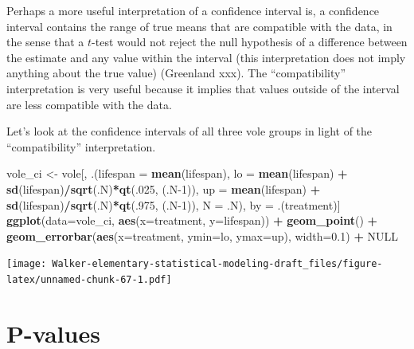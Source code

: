 \documentclass[]{book}
\newenvironment{Shaded}{\begin{snugshade}}{\end{snugshade}}
\newcommand{\DataTypeTok}[1]{\textcolor[rgb]{0.13,0.29,0.53}{#1}}
\newcommand{\DecValTok}[1]{\textcolor[rgb]{0.00,0.00,0.81}{#1}}
\newcommand{\FloatTok}[1]{\textcolor[rgb]{0.00,0.00,0.81}{#1}}
\newcommand{\KeywordTok}[1]{\textcolor[rgb]{0.13,0.29,0.53}{\textbf{#1}}}
\newcommand{\NormalTok}[1]{#1}
\newcommand{\OperatorTok}[1]{\textcolor[rgb]{0.81,0.36,0.00}{\textbf{#1}}}
\newcommand{\OtherTok}[1]{\textcolor[rgb]{0.56,0.35,0.01}{#1}}
\newcommand{\StringTok}[1]{\textcolor[rgb]{0.31,0.60,0.02}{#1}}
\begin{document}
Perhaps a more useful interpretation of a confidence interval is, a confidence interval contains the range of true means that are compatible with the data, in the sense that a \(t\)-test would not reject the null hypothesis of a difference between the estimate and any value within the interval (this interpretation does not imply anything about the true value) (Greenland xxx). The ``compatibility'' interpretation is very useful because it implies that values outside of the interval are less compatible with the data.

Let's look at the confidence intervals of all three vole groups in light of the ``compatibility'' interpretation.

\begin{Shaded}
\begin{Highlighting}[]
\NormalTok{vole_ci <-}\StringTok{ }\NormalTok{vole[, .(}\DataTypeTok{lifespan =} \KeywordTok{mean}\NormalTok{(lifespan),}
                    \DataTypeTok{lo =} \KeywordTok{mean}\NormalTok{(lifespan) }\OperatorTok{+}\StringTok{ }\KeywordTok{sd}\NormalTok{(lifespan)}\OperatorTok{/}\KeywordTok{sqrt}\NormalTok{(.N)}\OperatorTok{*}\KeywordTok{qt}\NormalTok{(.}\DecValTok{025}\NormalTok{, (.N}\DecValTok{-1}\NormalTok{)),}
                    \DataTypeTok{up =} \KeywordTok{mean}\NormalTok{(lifespan) }\OperatorTok{+}\StringTok{ }\KeywordTok{sd}\NormalTok{(lifespan)}\OperatorTok{/}\KeywordTok{sqrt}\NormalTok{(.N)}\OperatorTok{*}\KeywordTok{qt}\NormalTok{(.}\DecValTok{975}\NormalTok{, (.N}\DecValTok{-1}\NormalTok{)),}
                    \DataTypeTok{N =}\NormalTok{ .N),}
\NormalTok{                by =}\StringTok{ }\NormalTok{.(treatment)]}
\KeywordTok{ggplot}\NormalTok{(}\DataTypeTok{data=}\NormalTok{vole_ci, }\KeywordTok{aes}\NormalTok{(}\DataTypeTok{x=}\NormalTok{treatment, }\DataTypeTok{y=}\NormalTok{lifespan)) }\OperatorTok{+}
\StringTok{  }\KeywordTok{geom_point}\NormalTok{() }\OperatorTok{+}
\StringTok{  }\KeywordTok{geom_errorbar}\NormalTok{(}\KeywordTok{aes}\NormalTok{(}\DataTypeTok{x=}\NormalTok{treatment, }\DataTypeTok{ymin=}\NormalTok{lo, }\DataTypeTok{ymax=}\NormalTok{up), }
                \DataTypeTok{width=}\FloatTok{0.1}\NormalTok{) }\OperatorTok{+}
\StringTok{  }\OtherTok{NULL}
\end{Highlighting}
\end{Shaded}

\texttt{[image: Walker-elementary-statistical-modeling-draft\_files/figure-latex/unnamed-chunk-67-1.pdf]}

\hypertarget{p-values}{%
\chapter{P-values}\label{p-values}}
\end{document}
